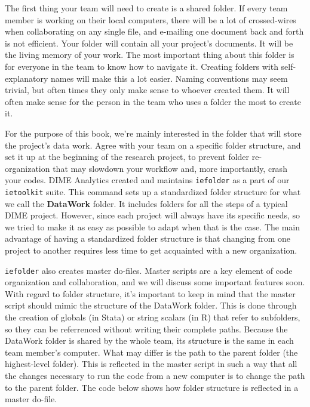 The first thing your team will need to create is a shared folder.
If every team member is working on their local computers, 
there will be a lot of crossed-wires when collaborating on any single file,
and e-mailing one document back and forth is not efficient.
Your folder will contain all your project's documents.
It will be the living memory of your work.
The most important thing about this folder is for everyone in the team to know how to navigate it.
Creating folders with self-explanatory names will make this a lot easier. 
Naming conventions may seem trivial, 
but often times they only make sense to whoever created them.
It will often make sense for the person in the team who uses a folder the most to create it.

For the purpose of this book, 
we're mainly interested in the folder that will store the project's data work.
Agree with your team on a specific folder structure, and
set it up at the beginning of the research project,
to prevent folder re-organization that may slowdown your workflow and,
more importantly, crash your codes.
DIME Analytics created and maintains 
\texttt{iefolder} 
as a part of our \texttt{ietoolkit} suite.
This command sets up a standardized folder structure for what we call the \textbf{DataWork} folder.
It includes folders for all the steps of a typical DIME project.
However, since each project will always have its specific needs,
so we tried to make it as easy as possible to adapt when that is the case.
The main advantage of having a standardized folder structure 
is that changing from one project to another requires less 
time to get acquainted with a new organization.

\texttt{iefolder} also creates master do-files.
Master scripts are a key element of code organization and collaboration,
and we will discuss some important features soon.
With regard to folder structure, it's important to keep in mind
that the master script should mimic the structure of the DataWork folder.
This is done through the creation of globals (in Stata) or string scalars (in R) 
that refer to subfolders, 
so they can be referrenced without writing their complete paths.
Because the DataWork folder is shared by the whole team,
its structure is the same in each team member's computer.
What may differ is the path to the parent folder (the highest-level folder).
This is reflected in the master script in such a way that 
all the changes necessary to run the code from a new computer 
is to change the path to the parent folder. 
The code below shows how folder structure is reflected in a master do-file.


